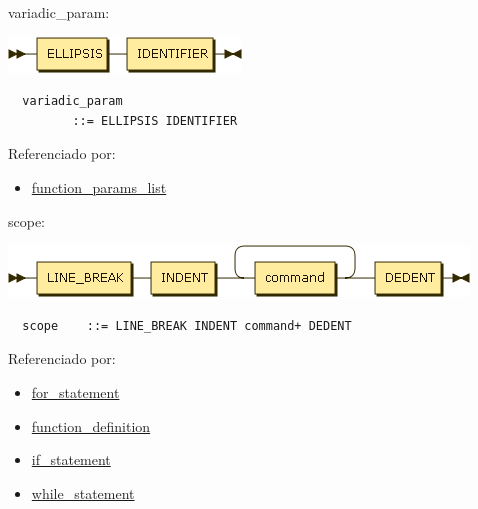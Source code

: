 \begin{minipage}{\textwidth}
  \protect\hypertarget{variadic_param}{}{variadic\_param:}

  \includegraphics[width=2.43750in,height=0.37500in]{diagram/variadic_param.png}

  \begin{verbatim}
  variadic_param
         ::= ELLIPSIS IDENTIFIER
  \end{verbatim}

  Referenciado por:

  \begin{itemize}
      \tightlist%
    \item
      \protect\hyperlink{function_params_list}{function\_params\_list}
  \end{itemize}

\end{minipage}

\begin{minipage}{\textwidth}
  \protect\hypertarget{scope}{}{scope:}

  \includegraphics[width=4.81250in,height=0.54167in]{diagram/scope.png}

  \begin{verbatim}
  scope    ::= LINE_BREAK INDENT command+ DEDENT
  \end{verbatim}

  Referenciado por:

  \begin{itemize}
      \tightlist%
    \item
      \protect\hyperlink{for_statement}{for\_statement}
    \item
      \protect\hyperlink{function_definition}{function\_definition}
    \item
      \protect\hyperlink{if_statement}{if\_statement}
    \item
      \protect\hyperlink{while_statement}{while\_statement}
  \end{itemize}

\end{minipage}

